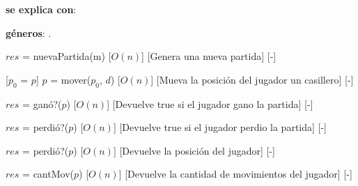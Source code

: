 \documentclass{book}
\begin{document}
    \newpage

    \begin{Interfaz}

        \textbf{se explica con}: 

        \textbf{géneros}: .


            {$res$ = nuevaPartida(m)}%
            [$O(n)$]
            [Genera una nueva partida]
            [-]

            [$p_0$ = $p$]
            {$p$ = mover($p_0$, $d$)}%
            [$O(n)$]
            [Mueva la posición del jugador un casillero]
            [-]

            {$res$ = ganó?($p$)}%
            [$O(n)$]
            [Devuelve true si el jugador gano la partida]
            [-]

            {$res$ = perdió?($p$)}%
            [$O(n)$]
            [Devuelve true si el jugador perdio la partida]
            [-]

            {$res$ = perdió?($p$)}%
            [$O(n)$]
            [Devuelve la posición del jugador]
            [-]

            {$res$ = cantMov($p$)}%
            [$O(n)$]
            [Devuelve la cantidad de movimientos del jugador]
            [-]

    \end{Interfaz}

    \newpage
\end{document}
